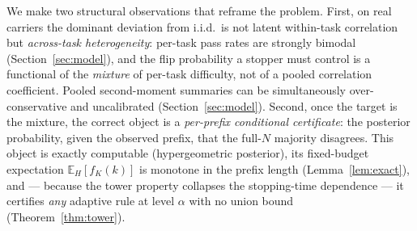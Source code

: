 \documentclass{article}
\theoremstyle{definition}
\theoremstyle{remark}
\newcommand{\E}{\mathbb{E}}
\begin{document}
We make two structural observations that reframe the problem. First, on real
carriers the dominant deviation from i.i.d.\ is not latent within-task
correlation but \emph{across-task heterogeneity}: per-task pass rates are
strongly bimodal (Section~\ref{sec:model}), and the flip probability a
stopper must control is a functional of the \emph{mixture} of per-task
difficulty, not of a pooled correlation coefficient. Pooled second-moment
summaries can be simultaneously over-conservative and uncalibrated
(Section~\ref{sec:model}). Second, once the target is the mixture, the
correct object is a \emph{per-prefix conditional certificate}: the posterior
probability, given the observed prefix, that the full-$N$ majority disagrees.
This object is exactly computable (hypergeometric posterior), its
fixed-budget expectation $\E_H[f_K(k)]$ is monotone in the prefix
length (Lemma~\ref{lem:exact}), and --- because the tower property
collapses the stopping-time
dependence --- it certifies \emph{any} adaptive rule at level $\alpha$ with no
union bound (Theorem~\ref{thm:tower}).
\end{document}
